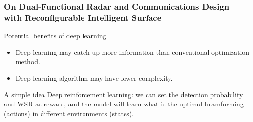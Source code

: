 \begin{frame}
    \frametitle{On Dual-Functional Radar and Communications Design with Reconfigurable Intelligent Surface}
    \begin{block}{Potential benefits of deep learning}
        \begin{itemize}
        \small
        \item Deep learning may catch up more information than conventional optimization method.
        \item Deep learning algorithm may have lower complexity.
        \end{itemize}    
    \end{block}

    \begin{block}{A simple idea}
        \small
        Deep reinforcement learning: we can set the detection probability and WSR as reward, and the model will learn what is the optimal beamforming (actions) in different environments (states).
    \end{block}
\end{frame}
